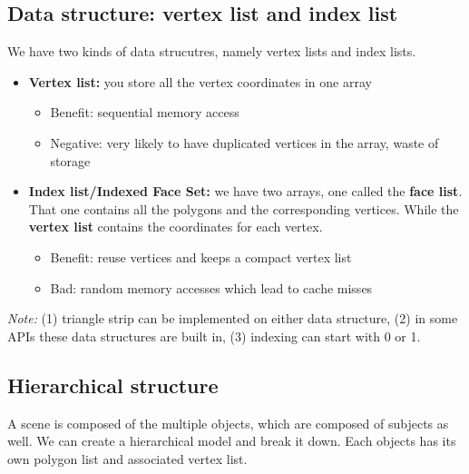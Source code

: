 \documentclass[11pt]{article}
\begin{document}

\subsection{Data structure: vertex list and index list}
We have two kinds of data strucutres, namely vertex lists and index lists. 
\begin{itemize}
    \item \textbf{Vertex list:} you store all the vertex coordinates in one array \begin{itemize}
        \item Benefit: sequential memory access
        \item Negative: very likely to have duplicated vertices in the array, waste of storage
    \end{itemize}
    \item \textbf{Index list/Indexed Face Set:} we have two arrays, one called the \textbf{face list}. That one contains all the polygons and the corresponding vertices. While the \textbf{vertex list} contains the coordinates for each vertex. \begin{itemize}
        \item Benefit: reuse vertices and keeps a compact vertex list
        \item Bad: random memory accesses which lead to cache misses
    \end{itemize}
\end{itemize}

\textit{Note:} (1) triangle strip can be implemented on either data structure, (2) in some APIs these data structures are built in, (3) indexing can start with 0 or 1.

\subsection{Hierarchical structure}
A scene is composed of the multiple objects, which are composed of subjects as well. We can create a hierarchical model and break it down. Each objects has its own polygon list and associated vertex list.
\end{document}
